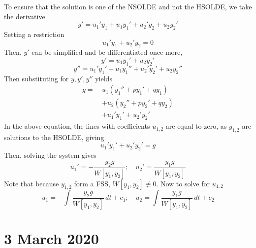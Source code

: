 \documentclass[twoside]{report}
\begin{document}
    \begin{bproof*}[14.1]
        To ensure that the solution is one of the NSOLDE and not the HSOLDE, we take the derivative
        \begin{equation}
            y' = u_{1}'y_{1} + u_{1}y_{1}' + u_{2}'y_{2} + u_{2}y_{2}'
        \end{equation}
        Setting a restriction
        \begin{equation}
            u_{1}'y_{1} + u_{2}'y_{2} = 0
        \end{equation}
        Then, $y'$ can be simplified and be differentiated once more,
        \begin{equation}
            y' = u_{1}y_{1}' + u_{2}y_{2}'
        \end{equation}
        \begin{equation}
            y'' = u_{1}'y_{1}' + u_{1}y_{1}'' + u_{2}'y_{2}' + u_{2}y_{2}''
        \end{equation}
        Then substituting for $y, y', y''$ yields
        \begin{equation}
            \begin{alignedat}{1}
                g =\ &u_{1}\left(y_{1}'' + py_{1}' + qy_{1}\right)\\
                &+u_{2}\left(y_{2}'' + py_{2}' + qy_{2}\right)\\
                &+u_{1}'y_{1}' + u_{2}'y_{2}'
            \end{alignedat}
        \end{equation}
        In the above equation, the lines with coefficients $u_{1,2}$ are equal to zero, as $y_{1,2}$ are solutions to the HSOLDE, giving
        \begin{equation}
            u_{1}'y_{1}' + u_{2}'y_{2}' = g
        \end{equation}
        Then, solving the system gives
        \begin{equation}
            u_{1}' = -\frac{y_{2}g}{W[y_{1}, y_{2}]};\quad u_{2}' = \frac{y_{1}g}{W[y_{1}, y_{2}]}
        \end{equation}
        Note that because $y_{1,2}$ form a FSS, $W[y_{1}, y_{2}] \nequiv 0$. Now to solve for $u_{1,2}$
        \begin{equation}
            u_{1} = -\int \frac{y_{2}g}{W[y_{1},y_{2}]}\,dt + c_{1};\quad u_{2} = \int \frac{y_{1}g}{W[y_{1},y_{2}]}\,dt + c_{2}
        \end{equation}
    \end{bproof*}
    \chapter{3 March 2020}
\end{document}
